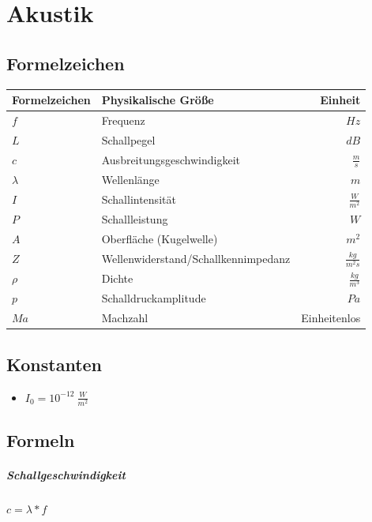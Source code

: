 \documentclass[12pt, a4paper]{scrreprt}
\begin{document}
\chapter{Akustik}

\section{Formelzeichen}

\begin{center}
  \makegapedcells{}
  \begin{tabular}{l l r}
    Formelzeichen & Physikalische Größe & Einheit\\
    \hline \hline
    \(f\) & Frequenz & \(Hz\)\\ \hline
    \(L\) & Schallpegel & \(dB\)\\ \hline
    \(c\) & Ausbreitungsgeschwindigkeit & \(\frac{m}{s}\)\\ \hline
    \(\lambda\) & Wellenlänge & \(m\)\\ \hline
    \(I\) & Schallintensität & \(\frac{W}{m^2}\)\\ \hline
    \(P\) & Schallleistung & \(W\)\\ \hline
    \(A\) & Oberfläche (Kugelwelle) & \(m^2\)\\ \hline
    \(Z\) & Wellenwiderstand/Schallkennimpedanz & \(\frac{kg}{m^2s}\)\\ \hline
    \(\rho\) & Dichte & \(\frac{kg}{m^3}\)\\ \hline
    \(p\) & Schalldruckamplitude & \(Pa\)\\ \hline
    \(Ma\) & Machzahl & Einheitenlos\\ \hline
  \end{tabular}
\end{center}

\section{Konstanten}
\begin{itemize}
\item \(I_0 = 10^{-12}\ \frac{W}{m^2}\)
\end{itemize}

\section{Formeln}
\paragraph{Schallgeschwindigkeit} \dotfill \(c=\lambda * f\)\\
\end{document}
